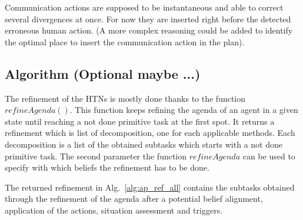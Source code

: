 \documentclass[letterpaper]{article} %
\begin{document}
Communication actions are supposed to be instantaneous and able to correct several divergences at once. For now they are inserted right before the detected erroneous human action. (A more complex reasoning could be added to identify the optimal place to insert the communication action in the plan). 



\subsection{Algorithm (Optional maybe ...)}

The refinement of the HTNs is mostly done thanks to the function $refineAgenda()$. This function keeps refining the agenda of an agent in a given state until reaching a not done primitive task at the first spot. It returns a refinement which is list of decomposition, one for each applicable methods. Each decomposition is a list of the obtained subtasks which starts with a not done primitive task. The second parameter the function $refineAgenda$ can be used to specify with which beliefs the refinement has to be done. 

The returned refinement in Alg.~\ref{alg:ap_ref_all} contains the subtasks obtained through the refinement of the agenda after a potential belief alignment, application of the actions, situation assessment and triggers.
\end{document}
